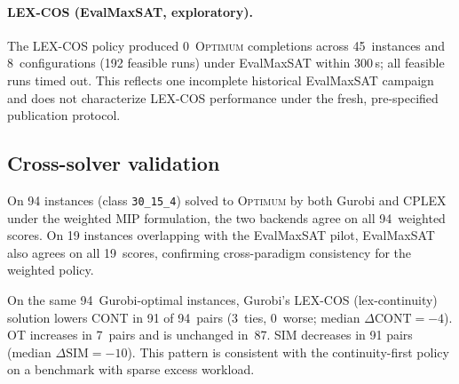 \paragraph{LEX-COS (EvalMaxSAT, exploratory).}
The LEX-COS policy produced 0~\textsc{Optimum} completions across
45~instances and 8~configurations (192 feasible runs) under EvalMaxSAT
within 300\,s; all feasible runs timed out.
This reflects one incomplete historical EvalMaxSAT campaign and does not
characterize LEX-COS performance under the fresh, pre-specified publication
protocol.

\subsection{Cross-solver validation}

On 94 instances (class \texttt{30\_15\_4}) solved to \textsc{Optimum} by both
Gurobi and CPLEX under the weighted MIP formulation, the two backends agree on
all 94~weighted scores.  On 19 instances overlapping with the EvalMaxSAT pilot,
EvalMaxSAT also agrees on all 19~scores, confirming cross-paradigm consistency
for the weighted policy.

On the same 94~Gurobi-optimal instances, Gurobi's LEX-COS (lex-continuity)
solution lowers CONT in 91 of 94~pairs (3~ties, 0~worse; median
$\Delta\mathrm{CONT}=-4$).  OT increases in 7~pairs and is unchanged in~87.
SIM decreases in 91 pairs (median $\Delta\mathrm{SIM}=-10$).
This pattern is consistent with the continuity-first policy on a benchmark with
sparse excess workload.

